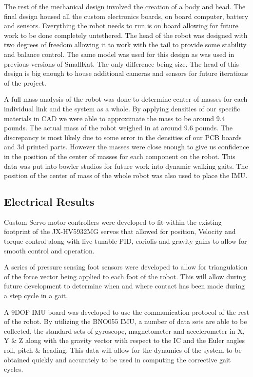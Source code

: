 The rest of the mechanical design involved the creation of a body and head. The final design housed all the custom electronics boards, on board computer, battery and sensors. Everything the robot needs to run is on board allowing for future work to be done completely untethered. The head of the robot was designed with two degrees of freedom allowing it to work with the tail to provide some stability and balance control. The same model was used for this design as was used in previous versions of SmallKat. The only difference being size. The head of this design is big enough to house additional cameras and sensors for future iterations of the project.

A full mass analysis of the robot was done to determine center of masses for each individual link and the system as a whole. By applying densities of our specific materials in CAD we were able to approximate the mass to be around 9.4 pounds. The actual mass of the robot weighed in at around 9.6 pounds. The discrepancy is most likely due to some error in the densities of our PCB boards and 3d printed parts. However the masses were close enough to give us confidence in the position of the center of masses for each component on the robot. This data was put into bowler studios for future work into dynamic walking gaits. The position of the center of mass of the whole robot was also used to place the IMU.



\subsection{Electrical Results}
Custom Servo motor controllers were developed to fit within the existing footprint of the JX-HV5932MG servos that allowed for position, Velocity and torque control along with live tunable PID, coriolis and gravity gains to allow for smooth control and operation. 

A series of pressure sensing foot sensors were developed to allow for triangulation of the force vector being applied to each foot of the robot. This will allow during future development to determine when and where contact has been made during a step cycle in a gait.

A 9DOF IMU board was developed to use the communication protocol of the rest of the robot. By utilizing the BNO055 IMU, a number of data sets are able to be collected, the standard sets of gyroscope, magnetometer and accelerometer in X, Y \& Z along with the gravity vector with respect to the IC and the Euler angles roll, pitch \& heading. This data will allow for the dynamics of the system to be obtained quickly and accurately to be used in computing the corrective gait cycles.

